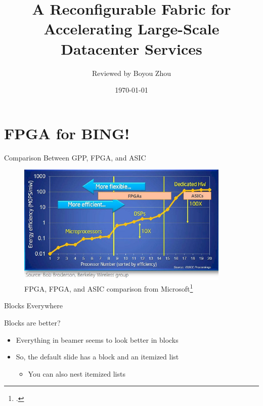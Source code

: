 \documentclass{beamer}
\title[FPGA for BING!]{A Reconfigurable Fabric for Accelerating Large-Scale Datacenter Services}
\author[bobzhou@bu.edu]{Reviewed by Boyou Zhou}
\date[\today]{\today}
\begin{document}
\maketitle

\section*{FPGA for BING!}

\begin{frame}{Comparison Between GPP, FPGA, and ASIC}
    \begin{figure}
        \includegraphics[width=4in]{img/microsoft-fpga-vs-cpu-vs-asic.png}
        \caption{FPGA, FPGA, and ASIC comparison from Microsoft\footcite{http://www.theplatform.net/2015/03/30/why-intel-might-buy-fpga-maker-altera}}
        \label{fig:comparison}
    \end{figure}
\end{frame}

\begin{frame}{Blocks Everywhere}
  \begin{block}{Blocks are better?}
    \begin{itemize}
    \item Everything in beamer seems to look better in blocks
    \item So, the default slide has a block and an itemized list
      \begin{itemize}
      \item You can also nest itemized lists
      \end{itemize}
    \end{itemize}
  \end{block}
\end{frame}
\end{document}
